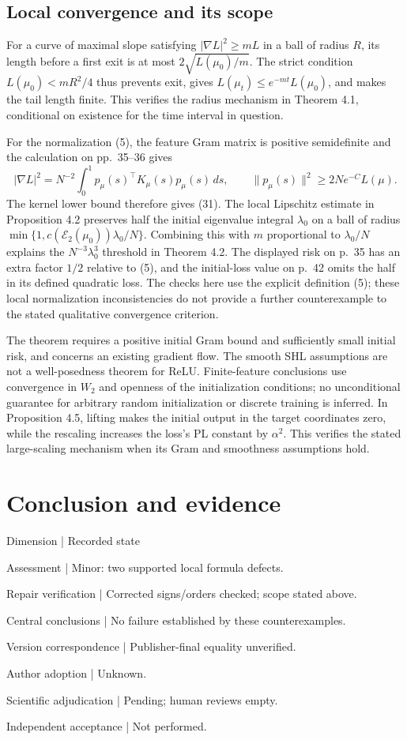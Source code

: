 \documentclass[10pt]{article}
\begin{document}
\subsection*{Local convergence and its scope}
For a curve of maximal slope satisfying \(|\nabla L|^2\geq mL\) in a ball of radius \(R\), its length before a first exit is at most \(2\sqrt{L(\mu_0)/m}\). The strict condition \(L(\mu_0)<mR^2/4\) thus prevents exit, gives \(L(\mu_t)\leq e^{-mt}L(\mu_0)\), and makes the tail length finite. This verifies the radius mechanism in Theorem 4.1, conditional on existence for the time interval in question.\par
For the normalization (5), the feature Gram matrix is positive semidefinite and the calculation on pp. 35–36 gives \[|\nabla L|^2
 =N^{-2}\int_0^1 p_\mu(s)^\top K_\mu(s)p_\mu(s)\,ds,\qquad
 \|p_\mu(s)\|^2\geq 2N e^{-C} L(\mu).\] The kernel lower bound therefore gives (31). The local Lipschitz estimate in Proposition 4.2 preserves half the initial eigenvalue integral \(\lambda_0\) on a ball of radius \(\min\{1,c(\mathcal E_2(\mu_0))\lambda_0/N\}\). Combining this with \(m\) proportional to \(\lambda_0/N\) explains the \(N^{-3}\lambda_0^3\) threshold in Theorem 4.2. The displayed risk on p. 35 has an extra factor \(1/2\) relative to (5), and the initial-loss value on p. 42 omits the half in its defined quadratic loss. The checks here use the explicit definition (5); these local normalization inconsistencies do not provide a further counterexample to the stated qualitative convergence criterion.\par
The theorem requires a positive initial Gram bound and sufficiently small initial risk, and concerns an existing gradient flow. The smooth SHL assumptions are not a well-posedness theorem for ReLU. Finite-feature conclusions use convergence in \(W_2\) and openness of the initialization conditions; no unconditional guarantee for arbitrary random initialization or discrete training is inferred. In Proposition 4.5, lifting makes the initial output in the target coordinates zero, while the rescaling increases the loss’s PL constant by \(\alpha^2\). This verifies the stated large-scaling mechanism when its Gram and smoothness assumptions hold.\par
\section*{Conclusion and evidence}
Dimension | Recorded state\par
Assessment | Minor: two supported local formula defects.\par
Repair verification | Corrected signs/orders checked; scope stated above.\par
Central conclusions | No failure established by these counterexamples.\par
Version correspondence | Publisher-final equality unverified.\par
Author adoption | Unknown.\par
Scientific adjudication | Pending; human reviews empty.\par
Independent acceptance | Not performed.\par
\end{document}

